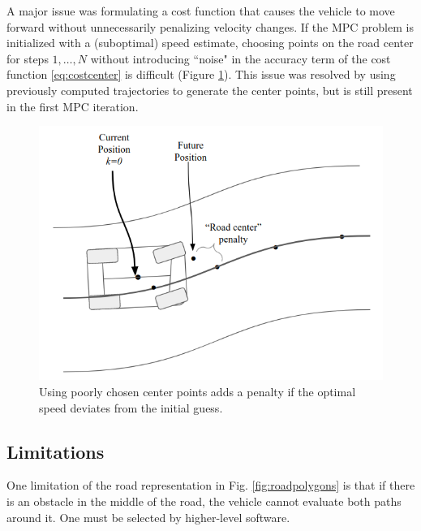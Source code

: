 \documentclass[conference]{IEEEtran}
\begin{document}
A major issue was formulating a cost function that causes the vehicle to move forward without  unnecessarily penalizing velocity changes.
If the MPC problem is initialized with a (suboptimal) speed estimate, choosing points on the road center for steps $1,\dots,N$ without introducing ``noise" in the accuracy term of the cost function \eqref{eq:costcenter} is difficult (Figure \ref{fig:centering_error}). This issue was resolved by using previously computed trajectories to generate the center points, but is still present in the first MPC iteration.

\vspace{2em}
\begin{figure}[h!]
	\centering
	\includegraphics[width=0.9\linewidth]{centering_issue.png}
	\caption{Using poorly chosen center points adds a penalty if the optimal speed deviates from the initial guess.}
	\label{fig:centering_error}
\end{figure}

\subsection{Limitations}
One limitation of the road representation in Fig. \ref{fig:roadpolygons} is that if there is an obstacle in the middle of the road, the vehicle cannot evaluate both paths around it. One must be selected by higher-level software.

\end{document}
